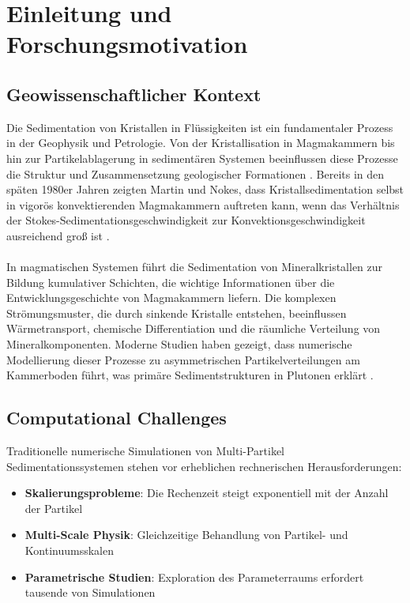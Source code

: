 
\chapter{Einleitung und Forschungsmotivation}
\label{ch:introduction}

\section{Geowissenschaftlicher Kontext}

Die Sedimentation von Kristallen in Flüssigkeiten ist ein fundamentaler Prozess in der Geophysik und Petrologie. Von der Kristallisation in Magmakammern bis hin zur Partikelablagerung in sedimentären Systemen beeinflussen diese Prozesse die Struktur und Zusammensetzung geologischer Formationen \parencite{martin1988crystal}. Bereits in den späten 1980er Jahren zeigten Martin und Nokes, dass Kristallsedimentation selbst in vigorös konvektierenden Magmakammern auftreten kann, wenn das Verhältnis der Stokes-Sedimentationsgeschwindigkeit zur Konvektionsgeschwindigkeit ausreichend groß ist \parencite{martin1988crystal,martin1989fluid}.\\
\\
In magmatischen Systemen führt die Sedimentation von Mineralkristallen zur Bildung kumulativer Schichten, die wichtige Informationen über die Entwicklungsgeschichte von Magmakammern liefern. Die komplexen Strömungsmuster, die durch sinkende Kristalle entstehen, beeinflussen Wärmetransport, chemische Differentiation und die räumliche Verteilung von Mineralkomponenten. Moderne Studien haben gezeigt, dass numerische Modellierung dieser Prozesse zu asymmetrischen Partikelverteilungen am Kammerboden führt, was primäre Sedimentstrukturen in Plutonen erklärt \parencite{verhoeven2009crystal}.

\section{Computational Challenges}

Traditionelle numerische Simulationen von Multi-Partikel Sedimentationssystemen stehen vor erheblichen rechnerischen Herausforderungen:

\begin{itemize}
	\item \textbf{Skalierungsprobleme}: Die Rechenzeit steigt exponentiell mit der Anzahl der Partikel
	\item \textbf{Multi-Scale Physik}: Gleichzeitige Behandlung von Partikel- und Kontinuumsskalen
	\item \textbf{Parametrische Studien}: Exploration des Parameterraums erfordert tausende von Simulationen
\end{itemize}

